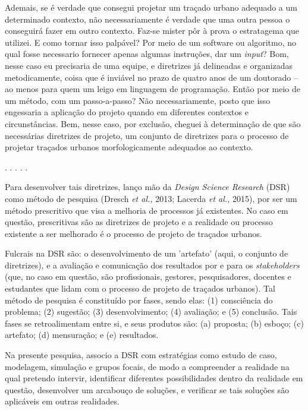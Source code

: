 \documentclass[]{report}
\begin{document}
	Ademais, se é verdade que consegui projetar um traçado urbano adequado a um determinado contexto, não necessariamente é verdade que uma outra pessoa o conseguirá fazer em outro contexto. Faz-se mister pôr à prova o estratagema que utilizei. E como tornar isso palpável? Por meio de um software ou algoritmo, no qual fosse necessario fornecer apenas algumas instruções, dar um \textit{input}? Bom, nesse caso eu precisaria de uma equipe, e diretrizes já delineadas e organizadas metodicamente, coisa que é inviável no prazo de quatro anos de um doutorado – ao menos para quem um leigo em linguagem de programação. Então por meio de um método, com um passo-a-passo? Não necessariamente, posto que isso engessaria a aplicação do projeto quando em diferentes contextos e circunstâncias. Bem, nesse caso, por exclusão, cheguei à determinação de que são necessárias diretrizes de projeto, um conjunto de diretrizes para o processo de projetar traçados urbanos morfologicamente adequados ao contexto.

	\begin{center}
		. . . . .
	\end{center}

	Para desenvolver tais diretrizes, lanço mão da \textit{Design Science Research} (DSR) como método de pesquisa (Dresch \textit{et al.,} 2013; Lacerda \textit{et al.,} 2015), por ser um método prescritivo que visa a melhoria de processos já existentes. No caso em questão, prescritivas são as diretrizes de projeto e a realidade ou processo existente a ser melhorado é o processo de projeto de traçados urbanos. 
	
	Fulcrais na DSR são: o desenvolvimento de um 'artefato' (aqui, o conjunto de diretrizes), e a avaliação e comunicação dos resultados por e para os \textit{stakeholders} (que, no caso em questão, são profissionais, gestores, pesquisadores, docentes e estudantes que lidam com o processo de projeto de traçados urbanos). Tal método de pesquisa é constituído por fases, sendo elas: (1) consciência do problema; (2) sugestão; (3) desenvolvimento; (4) avaliação; e (5) conclusão. Tais fases se retroalimentam entre si, e seus produtos são: (a) proposta; (b) esboço; (c) artefato; (d) mensuração; e (e) resultados.
	
	Na presente pesquisa, associo a DSR com estratégias como estudo de caso, modelagem, simulação e grupos focais, de modo a compreender a realidade na qual pretendo intervir, identificar diferentes possibilidades dentro da realidade em questão, desenvolver um arcabouço de soluções, e verificar se tais soluções são aplicáveis em outras realidades.
\end{document}
